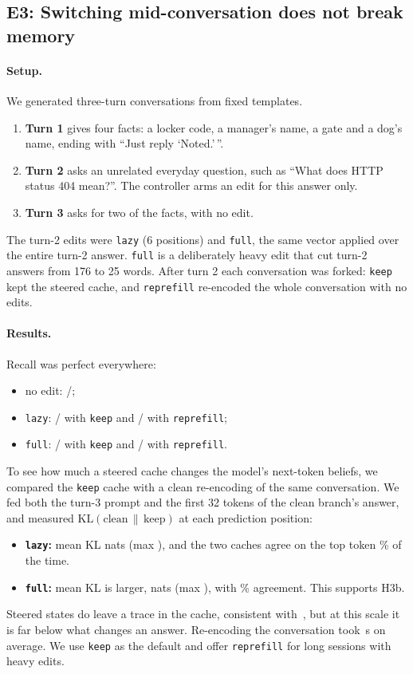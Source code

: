 \subsection{E3: Switching mid-conversation does not break memory}
\label{sec:e3}
\paragraph{Setup.} We generated \CtxN{} three-turn conversations from fixed templates.
\begin{enumerate}
\item \textbf{Turn 1} gives four facts: a locker code, a manager's name, a gate and a dog's name, ending with ``Just reply `Noted.'\,''.
\item \textbf{Turn 2} asks an unrelated everyday question, such as ``What does HTTP status 404 mean?''. The controller arms an edit for this answer only.
\item \textbf{Turn 3} asks for two of the facts, with no edit.
\end{enumerate}
The turn-2 edits were \texttt{lazy} (6 positions) and \texttt{full}, the same vector applied over the entire turn-2 answer. \texttt{full} is a deliberately heavy edit that cut turn-2 answers from 176 to 25 words. After turn 2 each conversation was forked: \texttt{keep} kept the steered cache, and \texttt{reprefill} re-encoded the whole conversation with no edits.

\paragraph{Results.} Recall was perfect everywhere:
\begin{itemize}
\item no edit: \RecallNone/\CtxN;
\item \texttt{lazy}: \RecallLazyKeep/\CtxN{} with \texttt{keep} and \RecallLazyRe/\CtxN{} with \texttt{reprefill};
\item \texttt{full}: \RecallFullKeep/\CtxN{} with \texttt{keep} and \RecallFullRe/\CtxN{} with \texttt{reprefill}.
\end{itemize}
To see how much a steered cache changes the model's next-token beliefs, we compared the \texttt{keep} cache with a clean re-encoding of the same conversation. We fed both the turn-3 prompt and the first 32 tokens of the clean branch's answer, and measured $\mathrm{KL}(\text{clean}\,\|\,\text{keep})$ at each prediction position:
\begin{itemize}
\item \textbf{\texttt{lazy}:} mean KL \KLLazyKeep{} nats (max \KLmaxLazyKeep), and the two caches agree on the top token \AgreeLazyKeep\% of the time.
\item \textbf{\texttt{full}:} mean KL is larger, \KLFullKeep{} nats (max \KLmaxFullKeep), with \AgreeFullKeep\% agreement. This supports H3b.
\end{itemize}
Steered states do leave a trace in the cache, consistent with~\cite{kang2026pad}, but at this scale it is far below what changes an answer. Re-encoding the conversation took \RepSecLazyRe\,s on average. We use \texttt{keep} as the default and offer \texttt{reprefill} for long sessions with heavy edits.
